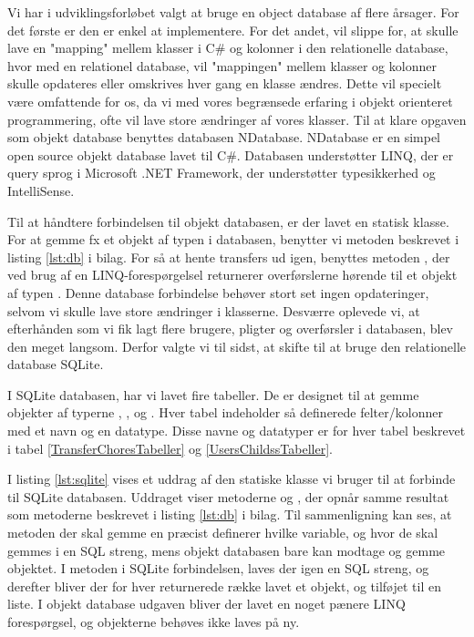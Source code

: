 Vi har i udviklingsforløbet valgt at bruge en object database af flere årsager. For det første er den er enkel at implementere. For det andet, vil slippe for, at skulle lave en "mapping" mellem klasser i C\# og kolonner i den relationelle database, hvor med en relationel database, vil "mappingen" mellem klasser og kolonner skulle opdateres eller omskrives hver gang en klasse ændres. Dette vil specielt være omfattende for os, da vi med vores begrænsede erfaring i objekt orienteret programmering, ofte vil lave store ændringer af vores klasser.
Til at klare opgaven som objekt database benyttes databasen NDatabase. NDatabase er en simpel open source objekt database lavet til C\#. Databasen understøtter LINQ, der er query sprog i Microsoft .NET Framework, der understøtter typesikkerhed og IntelliSense\cite{linqdok}.

Til at håndtere forbindelsen til objekt databasen, er der lavet en statisk klasse. For at gemme fx et objekt af typen  i databasen, benytter vi  metoden beskrevet i listing \ref{lst:db} i bilag. For så at hente transfers ud igen, benyttes metoden , der ved brug af en LINQ-forespørgelsel returnerer overførslerne hørende til et objekt af typen . Denne database forbindelse behøver stort set ingen opdateringer, selvom vi skulle lave store ændringer i klasserne.
Desværre oplevede vi, at efterhånden som vi fik lagt flere brugere, pligter og overførsler i databasen, blev den meget langsom. Derfor valgte vi til sidst, at skifte til at bruge den relationelle database SQLite.


I SQLite databasen, har vi lavet fire tabeller. De er designet til at gemme objekter af typerne , ,  og . Hver tabel indeholder så definerede felter/kolonner med et navn og en datatype. Disse navne og datatyper er for hver tabel beskrevet i tabel \ref{TransferChoresTabeller} og \ref{UsersChildssTabeller}. 

I listing \ref{lst:sqlite} vises et uddrag af den statiske klasse vi bruger til at forbinde til SQLite databasen. Uddraget viser metoderne  og , der opnår samme resultat som metoderne beskrevet i listing \ref{lst:db} i bilag. Til sammenligning kan ses, at metoden der skal gemme en  præcist definerer hvilke variable, og hvor de skal gemmes i en SQL streng, mens objekt databasen bare kan modtage og gemme objektet. I  metoden i SQLite forbindelsen, laves der igen en SQL streng, og derefter bliver der for hver returnerede række lavet et objekt, og tilføjet til en liste. I objekt database udgaven bliver der lavet en noget pænere LINQ forespørgsel, og objekterne behøves ikke laves på ny.

